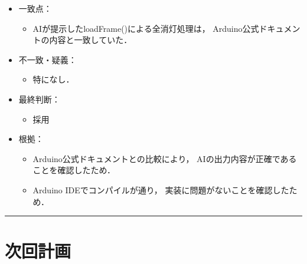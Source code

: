 \documentclass[uplatex,dvipdfmx,a4paper,11pt]{jsarticle}
\newcommand{\sectionrule}{\par\medskip\noindent\rule{\linewidth}{0.6pt}\par\medskip}
\begin{document}
\begin{itemize}

    \item 一致点：
      \begin{itemize}
        \item AIが提示したloadFrame()による全消灯処理は，
        Arduino公式ドキュメントの内容と一致していた．
      \end{itemize}

      \item 不一致・疑義：
    \begin{itemize}
      \item 特になし．
    \end{itemize}

  \item 最終判断：
    \begin{itemize}
      \item 採用
    \end{itemize}

    \item 根拠：
    \begin{itemize}
      \item Arduino公式ドキュメントとの比較により，
      AIの出力内容が正確であることを確認したため．

      \item Arduino IDEでコンパイルが通り，
      実装に問題がないことを確認したため．
    \end{itemize}

\end{itemize}


\sectionrule


\section{次回計画}
\end{document}
